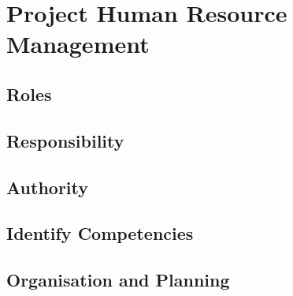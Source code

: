 \chapter{Project Human Resource Management}

\section{Roles}

\section{Responsibility}

\section{Authority}

\section{Identify Competencies}

\section{Organisation and Planning}